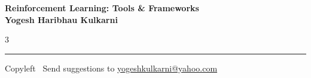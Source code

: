 \documentclass[8pt,landscape]{article}
\begin{document}
\footnotesize


\begin{center}
\Large{\textbf{Reinforcement Learning: Tools \& Frameworks\\ Yogesh Haribhau Kulkarni}}
\end{center}

\begin{multicols}{3}

\end{multicols}

\rule{\linewidth}{0.25pt}
\scriptsize
Copyleft \textcopyleft\  Send suggestions to
\href{http://www.yogeshkulkarni.com}{yogeshkulkarni@yahoo.com}
\end{document}
